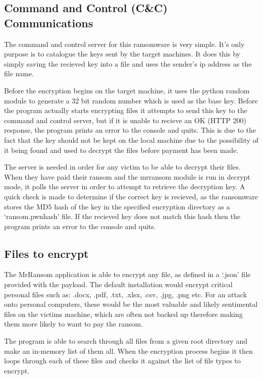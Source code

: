 \documentclass[12pt]{article}
\begin{document}
  \subsection{Command and Control (C\&C) Communications}
    The command and control server for this ransomware is very simple. It's only purpose is to catalogue the keys sent by the target machines. It does this by simply saving the recieved key into a file and uses the sender's ip address as the file name.

    Before the encryption begins on the target machine, it uses the python random module to generate a 32 bit random number which is used as the base key. Before the program actually starts encrypting files it attempts to send this key to the command and control server, but if it is unable to recieve an OK (HTTP 200) response, the program prints an error to the console and quits. This is due to the fact that the key should not be kept on the local machine due to the possibility of it being found and used to decrypt the files before payment has been made.

    The server is needed in order for any victim to be able to decrypt their files. When they have paid their ransom and the mrransom module is run in decrypt mode, it polls the server in order to attempt to retrieve the decryption key. A quick check is made to determine if the correct key is recieved, as the ransomware stores the MD5 hash of the key in the specified encryption directory as a ‘ransom.pwnhash’ file. If the recieved key does not match this hash then the program prints an error to the console and quits.

  \subsection{Files to encrypt}
    The MrRansom application is able to encrypt any file, as defined in a ‘.json’ file provided with the payload. The default installation would encrypt critical personal files such as: .docx, .pdf, .txt, .xlsx, .csv, .jpg, .png etc. For an attack onto personal computers, these would be the most valuable and likely sentimental files on the victims machine, which are often not backed up therefore making them more likely to want to pay the ransom.

    The program is able to search through all files from a given root directory and make an in-memory list of them all. When the encryption process begins it then loops through each of these files and checks it against the list of file types to encrypt.
\end{document}
